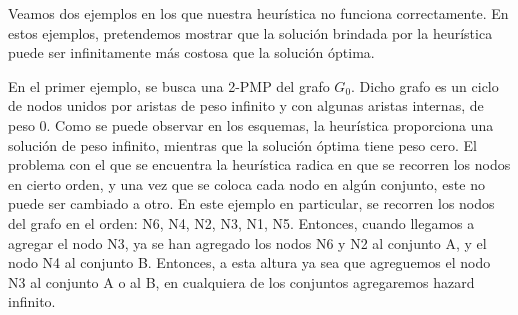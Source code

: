 \documentclass[11pt, a4paper, twoside]{article}
\begin{document}
\begin{enumerate}
		Veamos dos ejemplos en los que nuestra heurística no funciona correctamente. En estos ejemplos,
		pretendemos mostrar que la solución brindada por la heurística puede ser infinitamente más costosa que la solución
		óptima.
		
		En el primer ejemplo, se busca una 2-PMP del grafo $G_{0}$. Dicho grafo es un ciclo de nodos unidos por aristas 
		de peso infinito y con algunas aristas internas, de peso 0. Como se puede observar en los esquemas,
		la heurística proporciona una solución de peso infinito, mientras que la solución óptima tiene peso cero.
		El problema con el que se encuentra la heurística radica en que se recorren los nodos en cierto orden, y
		una vez que se coloca cada nodo en algún conjunto, este no puede ser cambiado a otro. En este 
		ejemplo en particular, se recorren los nodos del grafo en el orden: N6, N4, N2, N3, N1, N5. Entonces,
		cuando llegamos a agregar el nodo N3, ya se han agregado los nodos N6 y N2 al conjunto A, y el nodo
		N4 al conjunto B. Entonces, a esta altura ya sea que  agreguemos el nodo N3 al conjunto A o al B, en 
		cualquiera de los conjuntos agregaremos hazard infinito.
		

\end{enumerate}
\end{document}
